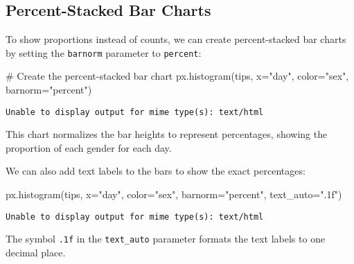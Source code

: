 \documentclass[
  letterpaper,
  DIV=11,
  numbers=noendperiod]{scrreprt}
\newenvironment{Shaded}{\begin{snugshade}}{\end{snugshade}}
\newcommand{\CommentTok}[1]{\textcolor[rgb]{0.37,0.37,0.37}{#1}}
\newcommand{\NormalTok}[1]{\textcolor[rgb]{0.00,0.23,0.31}{#1}}
\newcommand{\OperatorTok}[1]{\textcolor[rgb]{0.37,0.37,0.37}{#1}}
\newcommand{\StringTok}[1]{\textcolor[rgb]{0.13,0.47,0.30}{#1}}
\begin{document}
\subsection{Percent-Stacked Bar
Charts}\label{percent-stacked-bar-charts}

To show proportions instead of counts, we can create percent-stacked bar
charts by setting the \texttt{barnorm} parameter to
\texttt{\textquotesingle{}percent\textquotesingle{}}:

\begin{Shaded}
\begin{Highlighting}[]
\CommentTok{\# Create the percent{-}stacked bar chart}
\NormalTok{px.histogram(tips, x}\OperatorTok{=}\StringTok{"day"}\NormalTok{, color}\OperatorTok{=}\StringTok{"sex"}\NormalTok{, barnorm}\OperatorTok{=}\StringTok{"percent"}\NormalTok{)}
\end{Highlighting}
\end{Shaded}

\begin{verbatim}
Unable to display output for mime type(s): text/html
\end{verbatim}

This chart normalizes the bar heights to represent percentages, showing
the proportion of each gender for each day.

We can also add text labels to the bars to show the exact percentages:

\begin{Shaded}
\begin{Highlighting}[]
\NormalTok{px.histogram(tips, x}\OperatorTok{=}\StringTok{"day"}\NormalTok{, color}\OperatorTok{=}\StringTok{"sex"}\NormalTok{, barnorm}\OperatorTok{=}\StringTok{"percent"}\NormalTok{, text\_auto}\OperatorTok{=}\StringTok{".1f"}\NormalTok{)}
\end{Highlighting}
\end{Shaded}

\begin{verbatim}
Unable to display output for mime type(s): text/html
\end{verbatim}

The symbol \texttt{.1f} in the \texttt{text\_auto} parameter formats the
text labels to one decimal place.
\end{document}

